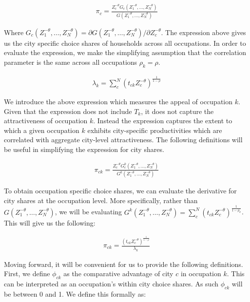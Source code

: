 \documentclass[10pt]{article}
\begin{document}
\begin{align*}
    \pi_c = \frac{Z_c^{- \theta} G_c(Z_1^{- \theta}, \dots, Z_N^{- \theta})}{G(Z_1^{- \theta}, \dots, Z_N^{- \theta})}
\end{align*}

Where $G_c (Z_1^{- \theta}, \dots, Z_N^{- \theta}) = \partial G(Z_1^{- \theta}, \dots, Z_N^{- \theta}) / \partial Z_c^{- \theta}$. The expression above gives us the city specific choice shares of households across all occupations. In order to evaluate the expression, we make the simplifying assumption that the correlation parameter is the same across all occupations $\rho_k = \rho$.

\begin{align*}
    \lambda_{k} = \sum_{c}^{N} \left( t_{ck} Z_{c}^{-\theta} \right)^{\frac{1}{1-\rho}}
\end{align*}

We introduce the above expression which measures the appeal of occupation $k$. Given that the expression does not include $T_k$, it does not capture the attractiveness of occupation $k$. Instead the expression captures the extent to which a given occupation $k$ exhibits city-specific productivities which are correlated with aggregate city-level attractiveness. The following definitions will be useful in simplifying the expression for city shares.

\begin{align*}
    \pi_{ck} = \frac{Z_c^{- \theta} G_c^k(Z_1^{- \theta}, \dots, Z_N^{- \theta})}{G^k(Z_1^{- \theta}, \dots, Z_N^{- \theta})}
\end{align*}

To obtain occupation specific choice shares, we can evaluate the derivative for city shares at the occupation level. More specifically, rather than $G(Z_1^{- \theta}, \dots, Z_N^{- \theta})$, we will be evaluating $G^k(Z_1^{- \theta}, \dots, Z_N^{- \theta}) = \sum_{c}^{N} (t_{ck} Z_c^{- \theta})^{\frac{1}{1 - \rho_k}}$. This will give us the following:

\begin{align}
    \pi_{ck} = \frac{(t_{ck} Z_c^{-\theta})^{\frac{1}{1 - \rho}}}{\lambda_k}
    \label{city_occuaption_shares}
\end{align}

Moving forward, it will be convenient for us to provide the following definitions. First, we define $\phi_{ck}$ as the comparative advantage of city $c$ in occupation $k$. This can be interpreted as an occupation's within city choice shares. As such $\phi_{ck}$ will be between 0 and 1. We define this formally as:
\end{document}
